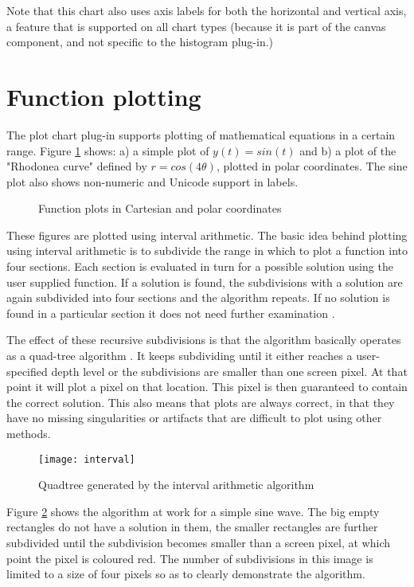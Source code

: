 Note that this chart also uses axis labels for both the horizontal and vertical axis, a feature that is supported on all chart types (because it is part of the canvas component, and not specific to the histogram plug-in.)

\section{Function plotting}
The plot chart plug-in supports plotting of mathematical equations in a certain range. Figure \ref{plots} shows: a) a simple plot of $y(t) = sin(t)$ and b) a plot of the "Rhodonea curve" defined by $r = cos(4\theta)$, plotted in polar coordinates. The sine plot also shows non-numeric and Unicode support in labels.

\begin{figure}[H]
	\centering
	\caption{Function plots in Cartesian and polar coordinates}
	\label{plots}
\end{figure}

These figures are plotted using interval arithmetic. The basic idea behind plotting using interval arithmetic is to subdivide the range in which to plot a function into four sections. Each section is evaluated in turn for a possible solution using the user supplied function. If a solution is found, the subdivisions with a solution are again subdivided into four sections and the algorithm repeats. If no solution is found in a particular section it does not need further examination \cite{shou05, fateman92, martin02}.

The effect of these recursive subdivisions is that the algorithm basically operates as a quad-tree algorithm \cite{finkel74}. It keeps subdividing until it either reaches a user-specified depth level or the subdivisions are smaller than one screen pixel. At that point it will plot a pixel on that location. This pixel is then guaranteed to contain the correct solution. This also means that plots are always correct, in that they have no missing singularities or artifacts that are difficult to plot using other methods.

\begin{figure}[H]
\centering
\texttt{[image: interval]}
\caption{Quadtree generated by the interval arithmetic algorithm}
\label{quadtree}
\end{figure}

Figure \ref{quadtree} shows the algorithm at work for a simple sine wave. The big empty rectangles do not have a solution in them, the smaller rectangles are further subdivided until the subdivision becomes smaller than a screen pixel, at which point the pixel is coloured red. The number of subdivisions in this image is limited to a size of four pixels so as to clearly demonstrate the algorithm.

